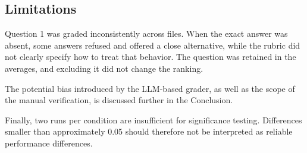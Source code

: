 \subsection{Limitations}
\label{subsec:ai-limitations}

Question 1 was graded inconsistently across files. When the exact answer was absent, some answers refused and offered a close alternative, while the rubric did not clearly specify how to treat that behavior. The question was retained in the averages, and excluding it did not change the ranking.

The potential bias introduced by the LLM-based grader, as well as the scope of the manual verification, is discussed further in the Conclusion.

Finally, two runs per condition are insufficient for significance testing. Differences smaller than approximately 0.05 should therefore not be interpreted as reliable performance differences.

